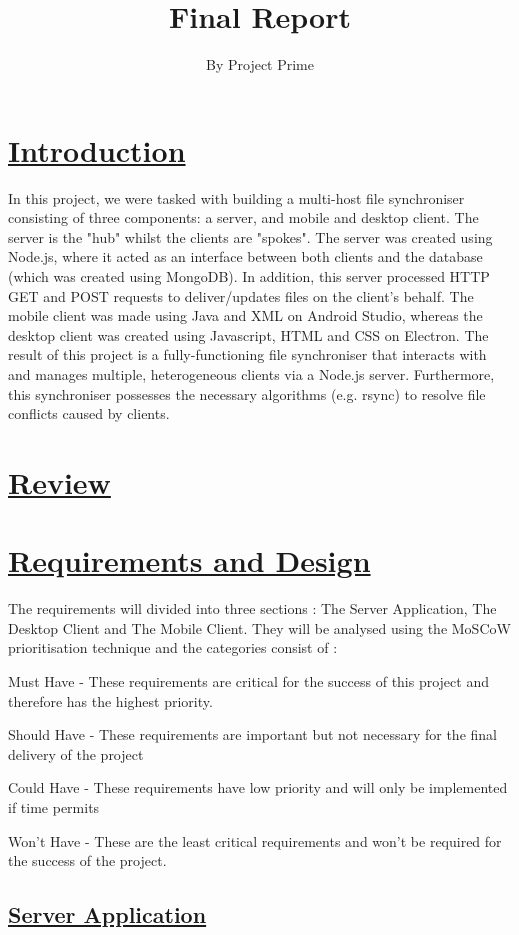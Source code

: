 \documentclass{article}
\title{Final Report}
\author{By Project Prime}
\begin{document}
 \maketitle
 \section{\underline{Introduction}}
In this project, we were tasked with building a multi-host file synchroniser consisting of three components: a server, and mobile and desktop client. The server is the "hub" whilst the clients are "spokes". The server was created using Node.js, where it acted as an interface between both clients and the database (which was created using MongoDB). In addition, this server processed HTTP GET and POST requests to deliver/updates files on the client's behalf. The mobile client was made using Java and XML on Android Studio, whereas the desktop client was created using Javascript, HTML and CSS on Electron. The result of this project is a fully-functioning file synchroniser that interacts with and manages multiple, heterogeneous clients via a Node.js server. Furthermore, this synchroniser possesses the necessary algorithms (e.g. rsync) to resolve file conflicts caused by clients. 

\section{\underline{Review}}

\section{\underline{Requirements and Design}}
The requirements will divided into three sections : The Server Application, The Desktop Client and The Mobile Client. They will be analysed using the MoSCoW prioritisation technique and the categories consist of :

Must Have - These requirements are critical for the success of this project and therefore has the highest priority.

Should Have - These requirements are important but not necessary for the final delivery of the project

Could Have - These requirements have low priority and will only be implemented if time permits

Won't Have - These are the least critical requirements and won't be required for the success of the project.

\subsection{\underline{Server Application}}
\end{document}
